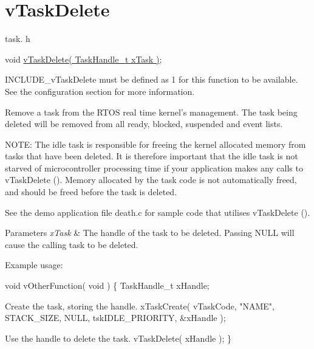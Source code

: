 \hypertarget{group__vTaskDelete}{\section{v\-Task\-Delete}
\label{group__vTaskDelete}
}
task. h 
\begin{DoxyPre}void \hyperlink{task_8h_a27ff4ebce26565bef136bda84201ff80}{vTaskDelete( TaskHandle\_t xTask )};\end{DoxyPre}


I\-N\-C\-L\-U\-D\-E\-\_\-v\-Task\-Delete must be defined as 1 for this function to be available. See the configuration section for more information.

Remove a task from the R\-T\-O\-S real time kernel's management. The task being deleted will be removed from all ready, blocked, suspended and event lists.

N\-O\-T\-E\-: The idle task is responsible for freeing the kernel allocated memory from tasks that have been deleted. It is therefore important that the idle task is not starved of microcontroller processing time if your application makes any calls to v\-Task\-Delete (). Memory allocated by the task code is not automatically freed, and should be freed before the task is deleted.

See the demo application file death.\-c for sample code that utilises v\-Task\-Delete ().


\begin{DoxyParams}{Parameters}
{\em x\-Task} & The handle of the task to be deleted. Passing N\-U\-L\-L will cause the calling task to be deleted.\\
\hline
\end{DoxyParams}
Example usage\-: 
\begin{DoxyPre}
 void vOtherFunction( void )
 \{
 TaskHandle\_t xHandle;\end{DoxyPre}



\begin{DoxyPre}Create the task, storing the handle.
     xTaskCreate( vTaskCode, "NAME", STACK\_SIZE, NULL, tskIDLE\_PRIORITY, \&xHandle );\end{DoxyPre}



\begin{DoxyPre}Use the handle to delete the task.
     vTaskDelete( xHandle );
 \}
   \end{DoxyPre}
 